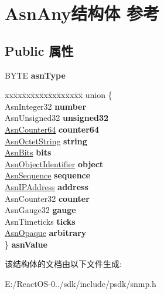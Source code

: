 \hypertarget{struct_asn_any}{}\section{Asn\+Any结构体 参考}
\label{struct_asn_any}
\subsection*{Public 属性}
\begin{DoxyCompactItemize}
\item 
\mbox{\label{struct_asn_any_a78b31c0ee7a68644cfd948dfdb8cf119}} 
B\+Y\+TE {\bfseries asn\+Type}
\item 
\mbox{\label{struct_asn_any_a1d4b5d355ae2f40adaffa490358095da}} 
\begin{tabbing}
xx\=xx\=xx\=xx\=xx\=xx\=xx\=xx\=xx\=\kill
union \{\\
\>AsnInteger32 {\bfseries number}\\
\>AsnUnsigned32 {\bfseries unsigned32}\\
\>\hyperlink{struct___u_l_a_r_g_e___i_n_t_e_g_e_r}{AsnCounter64} {\bfseries counter64}\\
\>\hyperlink{struct_asn_octet_string}{AsnOctetString} {\bfseries string}\\
\>\hyperlink{struct_asn_octet_string}{AsnBits} {\bfseries bits}\\
\>\hyperlink{struct_asn_object_identifier}{AsnObjectIdentifier} {\bfseries object}\\
\>\hyperlink{struct_asn_octet_string}{AsnSequence} {\bfseries sequence}\\
\>\hyperlink{struct_asn_octet_string}{AsnIPAddress} {\bfseries address}\\
\>AsnCounter32 {\bfseries counter}\\
\>AsnGauge32 {\bfseries gauge}\\
\>AsnTimeticks {\bfseries ticks}\\
\>\hyperlink{struct_asn_octet_string}{AsnOpaque} {\bfseries arbitrary}\\
\} {\bfseries asnValue}\\

\end{tabbing}\end{DoxyCompactItemize}


该结构体的文档由以下文件生成\+:\begin{DoxyCompactItemize}
\item 
E\+:/\+React\+O\+S-\/0../sdk/include/psdk/snmp.\+h\end{DoxyCompactItemize}
